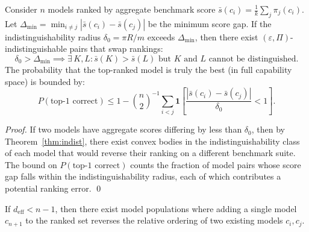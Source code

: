 \begin{corollary}
\label{cor:ranking}
Consider $n$ models ranked by aggregate benchmark score $\bar{s}(c_i) = \frac{1}{k}\sum_j \pi_j(c_i)$. Let $\Delta_{\min} = \min_{i \neq j} |\bar{s}(c_i) - \bar{s}(c_j)|$ be the minimum score gap. If the indistinguishability radius $\delta_0 = \pi R / m$ exceeds $\Delta_{\min}$, then there exist $(\varepsilon, \Pi)$-indistinguishable pairs that swap rankings:
\[
  \delta_0 > \Delta_{\min} \implies \exists\, K, L : \bar{s}(K) > \bar{s}(L) \text{ but } K \text{ and } L \text{ cannot be distinguished}.
\]
The probability that the top-ranked model is truly the best (in full capability space) is bounded by:
\[
  P(\text{top-1 correct}) \leq 1 - \binom{n}{2}^{-1} \sum_{i < j} \mathbf{1}\!\left[\frac{|\bar{s}(c_i) - \bar{s}(c_j)|}{\delta_0} < 1\right].
\]
\end{corollary}

\begin{proof}
If two models have aggregate scores differing by less than $\delta_0$, then by Theorem~\ref{thm:indist}, there exist convex bodies in the indistinguishability class of each model that would reverse their ranking on a different benchmark suite. The bound on $P(\text{top-1 correct})$ counts the fraction of model pairs whose score gap falls within the indistinguishability radius, each of which contributes a potential ranking error. \qed
\end{proof}


\begin{corollary}
\label{cor:reversal}
If $d_{\mathrm{eff}} < n - 1$, then there exist model populations where adding a single model $c_{n+1}$ to the ranked set reverses the relative ordering of two existing models $c_i, c_j$.
\end{corollary}

